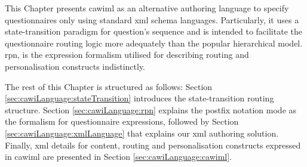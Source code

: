 	This Chapter presents \gls{cawiml} as an alternative authoring language to specify questionnaires only using standard \gls{xml} schema languages. Particularly, it uses a state-transition paradigm for question's sequence and is intended to facilitate the questionnaire routing logic more adequately than the popular hierarchical model. \gls{rpn}, is the expression formalism utilised for describing routing and personalisation constructs indistinctly.

	The rest of this Chapter is structured as follows: Section \ref{sec:cawiLanguage:stateTransition} introduces the state-transition routing structure. Section \ref{sec:cawiLanguage:rpn} explains the postfix notation mode as the formalism for questionnaire expressions, followed by Section \ref{sec:cawiLanguage:xmlLanguage} that explains our \gls{xml} authoring solution. Finally, \gls{xml} details for content, routing and personalisation constructs expressed in \gls{cawiml} are presented in Section \ref{sec:cawiLanguage:cawiml}.